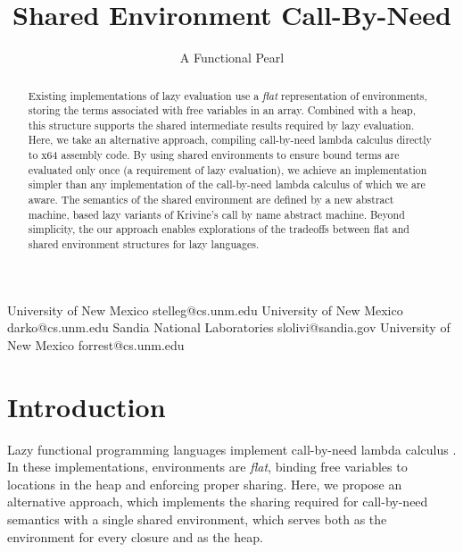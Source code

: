\documentclass[preprint]{sigplanconf}
\begin{document}
\title{Shared Environment Call-By-Need}
\subtitle{A Functional Pearl}

           {University of New Mexico}
           {stelleg@cs.unm.edu}
           {University of New Mexico}
           {darko@cs.unm.edu}
           {Sandia National Laboratories}
           {slolivi@sandia.gov}
           {University of New Mexico}
           {forrest@cs.unm.edu}

\maketitle

\begin{abstract}
  Existing implementations of lazy evaluation use a \emph{flat}
  representation of environments, storing the terms associated with
  free variables in an array.  Combined with a heap, this structure
  supports the shared intermediate results required by lazy
  evaluation.  Here, we take an alternative approach, compiling
  call-by-need lambda calculus directly to x64 assembly code.  By
  using shared environments to ensure bound terms are evaluated only
  once (a requirement of lazy evaluation), we achieve an
  implementation simpler than any implementation of the
  call-by-need lambda calculus of which we are aware.  The semantics
  of the shared environment are defined by a new abstract machine, based
  lazy variants of Krivine's call by name abstract machine.  Beyond simplicity,
  the our approach enables explorations of the tradeoffs between flat and shared
  environment structures for lazy languages.

\end{abstract}

\section{Introduction} \label{sec:intro}

Lazy functional programming languages implement call-by-need lambda calculus
\cite{ariola1995call}. In these implementations, environments are \emph{flat},
binding free variables to locations in the heap and enforcing proper sharing.
Here, we propose an alternative approach, which implements the sharing required
for call-by-need semantics with a single shared environment, which serves both
as the environment for every closure and as the heap. 
\end{document}
